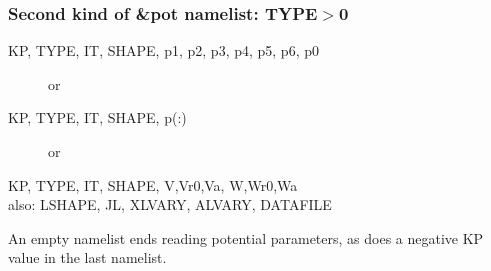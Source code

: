 \documentclass[11pt]{article}
\begin{document}
\subsubsection{Second kind of \&pot namelist: TYPE$>$0}

\begin{description}
\item[KP, TYPE,  IT, SHAPE, p1, p2, p3, p4, p5, p6, p0] or 
\item[KP, TYPE,  IT, SHAPE, p(:)] or 
\item[KP, TYPE, IT, SHAPE,  V,Vr0,Va,   W,Wr0,Wa] 
\item[{\rm also}: LSHAPE, JL, XLVARY, ALVARY, DATAFILE]
\end{description}

An empty namelist  ends reading potential parameters, as does a negative KP value in the last namelist.
\end{document}
